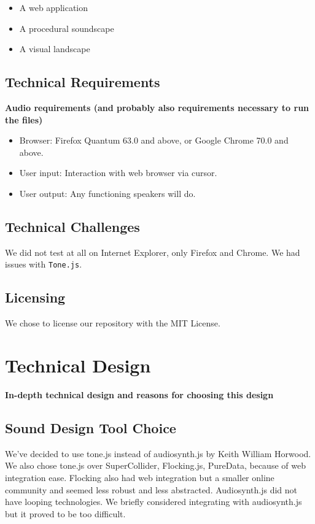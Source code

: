 \documentclass[12pt,a4paper]{article}
\newcommand{\lightcode}[1]{\colorbox{light-gray}{\texttt{#1}}}
\begin{document}
\begin{itemize}
	\item A web application
	\item A procedural soundscape
	\item A visual landscape
\end{itemize}

\subsection{Technical Requirements}
\textbf{Audio requirements (and probably also requirements necessary to run the files)}

\begin{itemize}
	\item Browser: Firefox Quantum 63.0 and above, or Google Chrome 70.0 and above.
	\item User input: Interaction with web browser via cursor.
	\item User output: Any functioning speakers will do.
\end{itemize}

\subsection{Technical Challenges}
We did not test at all on Internet Explorer, only Firefox and Chrome. We had issues with \lightcode{Tone.js}.


\subsection{Licensing}

We chose to license our repository with the MIT License.


\pagebreak
\section{Technical Design}
\textbf{In-depth technical design and reasons for choosing this design}

\subsection{Sound Design Tool Choice}

We've decided to use tone.js instead of audiosynth.js by Keith William Horwood. We also chose tone.js over SuperCollider, Flocking.js, PureData, because of web integration ease. Flocking also had web integration but a smaller online community and seemed less robust and less abstracted. Audiosynth.js did not have looping technologies. We briefly considered integrating with audiosynth.js but it proved to be too difficult.
\end{document}
